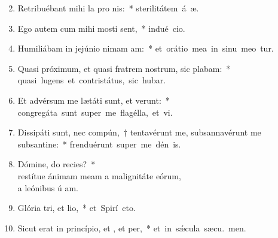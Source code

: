 \begin{flushleft}
\begin{enumerate}[leftmargin=*]
\setcounter{enumi}{1}

\item Retribuébant mihi la pro nis:~* \mbox{sterilitátem á æ.}
\item Ego autem cum mihi mosti sent,~* \mbox{indué cio.}
\item Humiliábam in jejúnio nimam am:~* \mbox{et orátio mea in sinu meo tur.}
\item Quasi próximum, et quasi fratrem nostrum, sic plabam:~* \mbox{quasi lugens et contristátus, sic hubar.}
\item Et advérsum me lætáti sunt, et verunt:~* \mbox{congregáta sunt super me flagélla, et vi.}
\item Dissipáti sunt, nec compún,~† tentavérunt me, subsannavérunt me subsantine:~* \mbox{frenduérunt super me dén is.}
\item Dómine, do recies?~* \\restítue ánimam meam a malignitáte eórum, \\a leónibus ú am.
\item Glória tri, et lio,~* \mbox{et Spirí cto.}
\item Sicut erat in princípio, et , et per,~* \mbox{et in s\'{\ae}cula sæcu. men.}

\end{enumerate}
\end{flushleft}

